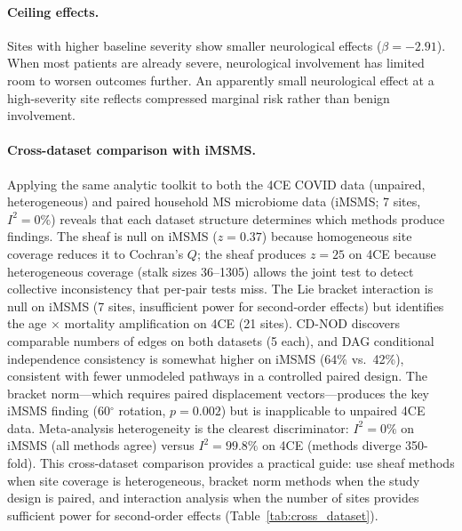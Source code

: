 \documentclass{article}
\begin{document}
\paragraph{Ceiling effects.}
Sites with higher baseline severity show smaller neurological effects ($\beta = -2.91$).
When most patients are already severe, neurological involvement has limited room to worsen outcomes further.
An apparently small neurological effect at a high-severity site reflects compressed marginal risk rather than benign involvement.

\paragraph{Cross-dataset comparison with iMSMS.}
Applying the same analytic toolkit to both the 4CE COVID data (unpaired, heterogeneous) and paired household MS microbiome data (iMSMS; 7 sites, $I^2 = 0\%$) reveals that each dataset structure determines which methods produce findings.
The sheaf is null on iMSMS ($z = 0.37$) because homogeneous site coverage reduces it to Cochran's $Q$; the sheaf produces $z = 25$ on 4CE because heterogeneous coverage (stalk sizes 36--1305) allows the joint test to detect collective inconsistency that per-pair tests miss.
The Lie bracket interaction is null on iMSMS (7 sites, insufficient power for second-order effects) but identifies the age $\times$ mortality amplification on 4CE (21 sites).
CD-NOD discovers comparable numbers of edges on both datasets (5 each), and DAG conditional independence consistency is somewhat higher on iMSMS (64\% vs.\ 42\%), consistent with fewer unmodeled pathways in a controlled paired design.
The bracket norm---which requires paired displacement vectors---produces the key iMSMS finding (60$^{\circ}$ rotation, $p = 0.002$) but is inapplicable to unpaired 4CE data.
Meta-analysis heterogeneity is the clearest discriminator: $I^2 = 0\%$ on iMSMS (all methods agree) versus $I^2 = 99.8\%$ on 4CE (methods diverge 350-fold).
This cross-dataset comparison provides a practical guide: use sheaf methods when site coverage is heterogeneous, bracket norm methods when the study design is paired, and interaction analysis when the number of sites provides sufficient power for second-order effects (Table~\ref{tab:cross_dataset}).
\end{document}
